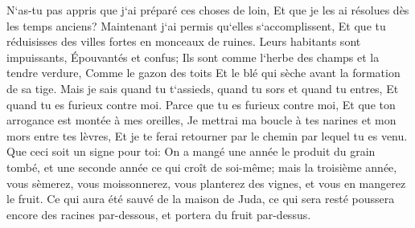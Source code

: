 \verse N`as-tu pas appris que j`ai préparé ces choses de loin, Et que je les ai résolues dès les temps anciens? Maintenant j`ai permis qu`elles s`accomplissent, Et que tu réduisisses des villes fortes en monceaux de ruines. 
\verse Leurs habitants sont impuissants, Épouvantés et confus; Ils sont comme l`herbe des champs et la tendre verdure, Comme le gazon des toits Et le blé qui sèche avant la formation de sa tige. 
\verse Mais je sais quand tu t`assieds, quand tu sors et quand tu entres, Et quand tu es furieux contre moi. 
\verse Parce que tu es furieux contre moi, Et que ton arrogance est montée à mes oreilles, Je mettrai ma boucle à tes narines et mon mors entre tes lèvres, Et je te ferai retourner par le chemin par lequel tu es venu. 
\verse Que ceci soit un signe pour toi: On a mangé une année le produit du grain tombé, et une seconde année ce qui croît de soi-même; mais la troisième année, vous sèmerez, vous moissonnerez, vous planterez des vignes, et vous en mangerez le fruit. 
\verse Ce qui aura été sauvé de la maison de Juda, ce qui sera resté poussera encore des racines par-dessous, et portera du fruit par-dessus. 
